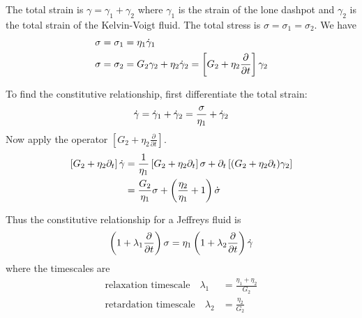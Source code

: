 \documentclass{jknotes}
\begin{document}
\begin{center}
\end{center}

The total strain is $\gamma = \gamma_1 + \gamma_2$ where $\gamma_1$ is the
strain of the lone dashpot and $\gamma_2$ is the total strain of the
Kelvin-Voigt fluid. The total stress is $\sigma = \sigma_1 = \sigma_2$. We
have
\begin{align}
	\sigma = \sigma_1 &= \eta_1 \dot{\gamma}_1 \\
	\sigma = \sigma_2 &= G_2 \gamma_2 + \eta_2 \dot{\gamma}_2 = \left[ G_2 + \eta_2
	\frac{\partial}{\partial t}\right] \gamma_2
\end{align}

To find the constitutive relationship, first differentiate the total strain:
\begin{equation}
	\dot{\gamma} = \dot{\gamma}_1 + \dot{\gamma}_2 = \frac{\sigma}{\eta_1} + \dot{\gamma}_2
\end{equation}
Now apply the operator $\left[ G_2 + \eta_2 \frac{\partial}{\partial
t}\right]$.
\begin{align}
	\left[ G_2 + \eta_2 \partial_t\right] \dot{\gamma} &= \frac{1}{\eta_1} \left[
		G_2 + \eta_2 \partial_t\right]\sigma + \partial_t \left[ (G_2 + \eta_2
	\partial_t) \gamma_2\right] \\
	&= \frac{G_2}{\eta_1}\sigma + \left( \frac{\eta_2}{\eta_1}+1\right)
	\dot{\sigma}
\end{align}

Thus the constitutive relationship for a Jeffreys fluid is
\begin{equation}
	\left( 1 + \lambda_1\frac{\partial}{\partial
	t}\right) \sigma=
	\eta_1 \left( 1 + \lambda_2 \frac{\partial}{\partial t} \right)
	\dot{\gamma} 
\end{equation}
where the timescales are
\begin{align}
	\text{relaxation timescale} \hspace{1em} \lambda_1 &=
	\frac{\eta_1+\eta_2}{G_2} \\
	\text{retardation timescale} \hspace{1em} \lambda_2 &= \frac{\eta_2}{G_2}
\end{align}
\end{document}
